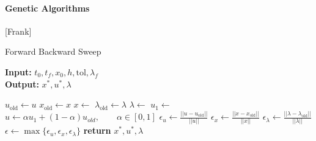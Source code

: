 \paragraph{Genetic Algorithms}
[Frank]
\begin{algorithm}
  \caption{Forward Backward Sweep } \label{alg:forward_backward_sweep}
  \begin{flushleft}
    \hspace*{\algorithmicindent} \textbf{Input:} 
    $t_0, t_f, x_0,h, \text{tol}, \lambda_{f}$ \\
    \hspace*{\algorithmicindent} \textbf{Output:} 
    $x^*, u^*, \lambda$
  \end{flushleft}
  \begin{algorithmic}
    \State $u_{\text{old}} \gets u$ 
    \State $x_{\text{old}} \gets x$ 
    \State $ x \gets$
    \State $\lambda_{\text{old}} \gets \lambda $
    \State $\lambda \gets$ 
    \State $u_1 \gets$ 
    \State 
    $u \gets \alpha u_1 + (1-\alpha)u_{old}, 
    \qquad \alpha \in [0, 1]$
    \State 
    $\epsilon_u \gets \displaystyle 
    \frac{||u - u_{\text{old}}||}{||u||}$
    \State 
    $\epsilon_x \gets \displaystyle 
    \frac{||x - x_{\text{old}}||}{||x||}$
    \State 
    $\epsilon_{\lambda} \gets \displaystyle 
    \frac{||\lambda - \lambda_{\text{old}}||}{||\lambda||}$
    \State 
    $\epsilon \gets 
    \max{ 
      \{ \epsilon_u, \epsilon_x, \epsilon_{\lambda} \}
    }$
    \EndWhile\label{}
    \State \textbf{return} $ x^*, u^*, \lambda$
    \EndProcedure
  \end{algorithmic}
\end{algorithm}
